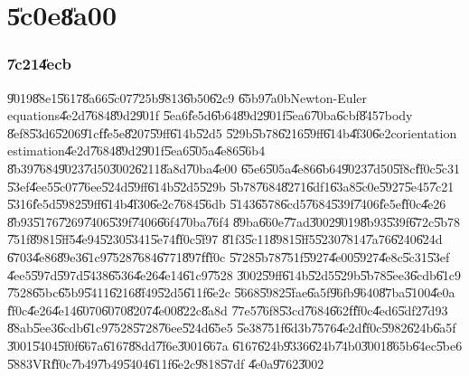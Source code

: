 \documentclass[12pt,a4paper]{article}
\begin{document}
%

\part{\U{5c0e}\U{8a00}}

\section{\U{7c21}\U{4ecb}}

\U{9019}\U{88e1}\U{5617}\U{8a66}\U{5c07}\U{725b}\U{9813}\U{6b50}\U{62c9}%
\U{65b9}\U{7a0b}Newton-Euler equations\U{4e2d}\U{7684}\U{89d2}\U{901f}%
\U{5ea6}\U{fe5d}\U{6b64}\U{89d2}\U{901f}\U{5ea6}\U{70ba}\U{6cbf}\U{8457}body%
\U{8ef8}\U{53d6}\U{5206}\U{91cf}\U{fe5e}\U{8207}\U{59ff}\U{614b}\U{52d5}%
\U{529b}\U{5b78}\U{6216}\U{59ff}\U{614b}\U{4f30}\U{6e2c}orientation
estimation\U{4e2d}\U{7684}\U{89d2}\U{901f}\U{5ea6}\U{505a}\U{4e86}\U{56b4}%
\U{8b39}\U{7684}\U{9023}\U{7d50}\U{3002}\U{6211}\U{8a8d}\U{70ba}\U{4e00}%
\U{65e6}\U{505a}\U{4e86}\U{6b64}\U{9023}\U{7d50}\U{5f8c}\U{ff0c}\U{5c31}%
\U{53ef}\U{4ee5}\U{5c07}\U{76ee}\U{524d}\U{59ff}\U{614b}\U{52d5}\U{529b}%
\U{5b78}\U{7684}\U{8271}\U{6df1}\U{63a8}\U{5c0e}\U{5927}\U{5e45}\U{7c21}%
\U{5316}\U{fe5d}\U{5982}\U{59ff}\U{614b}\U{4f30}\U{6e2c}\U{7684}\U{56db}%
\U{5143}\U{6578}\U{6cd5}\U{7684}\U{539f}\U{7406}\U{fe5e}\U{ff0c}\U{4e26}%
\U{8b93}\U{5176}\U{7269}\U{7406}\U{539f}\U{7406}\U{66f4}\U{70ba}\U{76f4}%
\U{89ba}\U{660e}\U{77ad}\U{3002}\U{9019}\U{8b93}\U{539f}\U{672c}\U{5b78}%
\U{751f}\U{8981}\U{5ff5}\U{4e94}\U{5230}\U{5341}\U{5e74}\U{ff0c}\U{5f97}%
\U{81f3}\U{5c11}\U{8981}\U{5ff5}\U{5230}\U{7814}\U{7a76}\U{6240}\U{624d}%
\U{6703}\U{4e86}\U{89e3}\U{61c9}\U{7528}\U{7684}\U{6771}\U{897f}\U{ff0c}%
\U{5728}\U{5b78}\U{751f}\U{5927}\U{4e00}\U{5927}\U{4e8c}\U{5c31}\U{53ef}%
\U{4ee5}\U{597d}\U{597d}\U{5438}\U{6536}\U{4e26}\U{4e14}\U{61c9}\U{7528}%
\U{3002}\U{59ff}\U{614b}\U{52d5}\U{529b}\U{5b78}\U{5ee3}\U{6cdb}\U{61c9}%
\U{7528}\U{65bc}\U{65b9}\U{5411}\U{6216}\U{8f49}\U{52d5}\U{611f}\U{6e2c}%
\U{5668}\U{5982}\U{5fae}\U{6a5f}\U{96fb}\U{9640}\U{87ba}\U{5100}\U{4e0a}%
\U{ff0c}\U{4e26}\U{4e14}\U{6070}\U{6070}\U{8207}\U{4e00}\U{822c}\U{8a8d}%
\U{77e5}\U{76f8}\U{53cd}\U{7684}\U{662f}\U{ff0c}\U{4ed6}\U{5df2}\U{7d93}%
\U{88ab}\U{5ee3}\U{6cdb}\U{61c9}\U{7528}\U{5728}\U{76ee}\U{524d}\U{65e5}%
\U{5e38}\U{751f}\U{6d3b}\U{7576}\U{4e2d}\U{ff0c}\U{5982}\U{624b}\U{6a5f}%
\U{3001}\U{5404}\U{5f0f}\U{667a}\U{6167}\U{88dd}\U{7f6e}\U{3001}\U{667a}%
\U{6167}\U{624b}\U{9336}\U{624b}\U{74b0}\U{3001}\U{865b}\U{64ec}\U{5be6}%
\U{5883}VR\U{ff0c}\U{7b49}\U{7b49}\U{5404}\U{611f}\U{6e2c}\U{9818}\U{57df}%
\U{4e0a}\U{9762}\U{3002}
\end{document}
